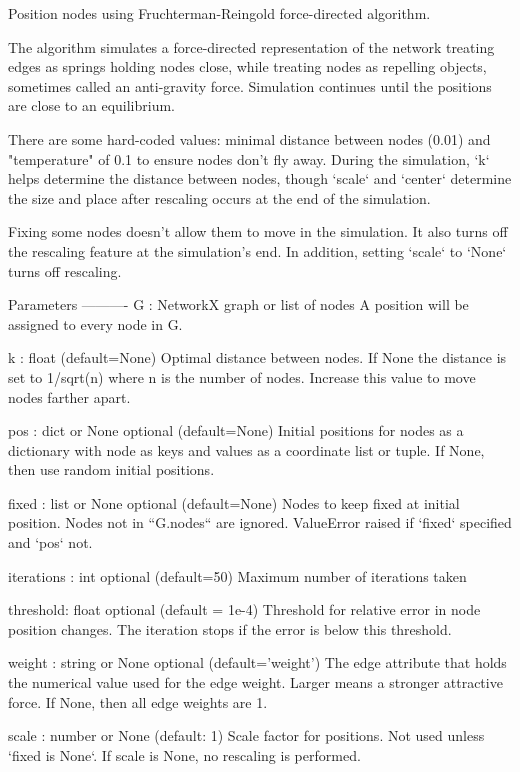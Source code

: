 \begin{DoxyVerb}Position nodes using Fruchterman-Reingold force-directed algorithm.

The algorithm simulates a force-directed representation of the network
treating edges as springs holding nodes close, while treating nodes
as repelling objects, sometimes called an anti-gravity force.
Simulation continues until the positions are close to an equilibrium.

There are some hard-coded values: minimal distance between
nodes (0.01) and "temperature" of 0.1 to ensure nodes don't fly away.
During the simulation, `k` helps determine the distance between nodes,
though `scale` and `center` determine the size and place after
rescaling occurs at the end of the simulation.

Fixing some nodes doesn't allow them to move in the simulation.
It also turns off the rescaling feature at the simulation's end.
In addition, setting `scale` to `None` turns off rescaling.

Parameters
----------
G : NetworkX graph or list of nodes
    A position will be assigned to every node in G.

k : float (default=None)
    Optimal distance between nodes.  If None the distance is set to
    1/sqrt(n) where n is the number of nodes.  Increase this value
    to move nodes farther apart.

pos : dict or None  optional (default=None)
    Initial positions for nodes as a dictionary with node as keys
    and values as a coordinate list or tuple.  If None, then use
    random initial positions.

fixed : list or None  optional (default=None)
    Nodes to keep fixed at initial position.
    Nodes not in ``G.nodes`` are ignored.
    ValueError raised if `fixed` specified and `pos` not.

iterations : int  optional (default=50)
    Maximum number of iterations taken

threshold: float optional (default = 1e-4)
    Threshold for relative error in node position changes.
    The iteration stops if the error is below this threshold.

weight : string or None   optional (default='weight')
    The edge attribute that holds the numerical value used for
    the edge weight.  Larger means a stronger attractive force.
    If None, then all edge weights are 1.

scale : number or None (default: 1)
    Scale factor for positions. Not used unless `fixed is None`.
    If scale is None, no rescaling is performed.


\end{DoxyVerb}
